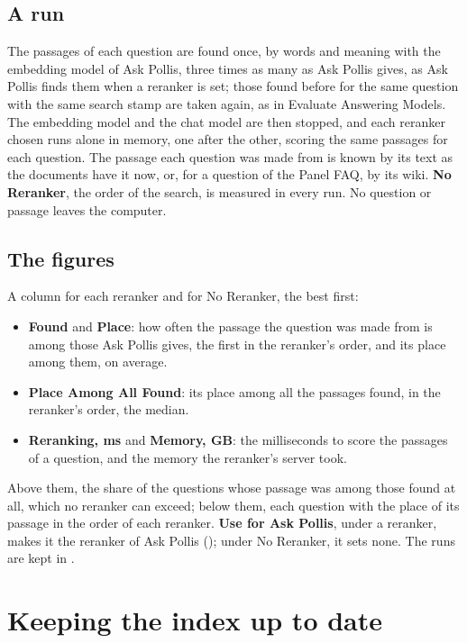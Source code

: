 \subsection{A run}
The passages of each question are found once, by words and meaning with the embedding model of Ask Pollis, three times
as many as Ask Pollis gives, as Ask Pollis finds them when a reranker is set; those found before for the same question
with the same search stamp are taken again, as in Evaluate Answering Models. The embedding model and the chat model are
then stopped, and each reranker chosen runs alone in memory, one after the other, scoring the same passages for each
question. The passage each question was made from is known by its text as the documents have it now, or, for a question
of the Panel FAQ, by its wiki. \textbf{No Reranker}, the order of the search, is measured in every run. No question or
passage leaves the computer.

\subsection{The figures}
A column for each reranker and for No Reranker, the best first:
\begin{itemize}
  \item \textbf{Found} and \textbf{Place}: how often the passage the question was made from is among those Ask Pollis
    gives, the first in the reranker's order, and its place among them, on average.
  \item \textbf{Place Among All Found}: its place among all the passages found, in the reranker's order, the median.
  \item \textbf{Reranking, ms} and \textbf{Memory, GB}: the milliseconds to score the passages of a question, and the
    memory the reranker's server took.
\end{itemize}
Above them, the share of the questions whose passage was among those found at all, which no reranker can exceed;
below them, each question with the place of its passage in the order of each reranker. \textbf{Use for Ask Pollis},
under a reranker, makes it the reranker of Ask Pollis (); under No Reranker, it sets none.
The runs are kept in .

\section{Keeping the index up to date}\label{sec:fresh}


